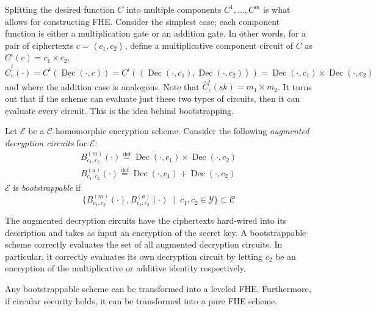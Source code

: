 Splitting the desired function $C$ into multiple components $C^1, \dots, C^m$ is what allows for constructing FHE. Consider the simplest case; each component function is either a multiplication gate or an addition gate. In other words, for a pair of ciphertexts $c = \left\langle c_1, c_2 \right\rangle$, define a multiplicative component circuit of $C$ as $C^i(c) = c_1 \times c_2$, $\hat{C}^i_c(\cdot) = C^i(\operatorname{Dec}(\cdot, c)) = C^i(\left\langle \operatorname{Dec}(\cdot, c_1), \operatorname{Dec}(\cdot, c_2) \right\rangle) = \operatorname{Dec}(\cdot, c_1) \times \operatorname{Dec}(\cdot, c_2)$ and where the addition case is analogous. Note that $\hat{C}^i_c(sk) = m_1 \times m_2$. It turns out that if the scheme can evaluate just these two types of circuits, then it can evaluate every circuit. This is the idea behind bootstrapping.
\begin{definition}
    \label{def:bootstrappable}
    Let $\mathcal{E}$ be a $\mathcal{C}$-homomorphic encryption scheme. Consider the following \emph{augmented decryption circuits} for $\mathcal{E}$:
    \begin{equation*}
    \begin{aligned}        
        B_{c_1,c_2}^{(m)}(\cdot) \stackrel{\mathrm{def}}{=} \operatorname{Dec}(\cdot, c_1) \times \operatorname{Dec}(\cdot, c_2)\\
        B_{c_1,c_2}^{(a)}(\cdot) \stackrel{\mathrm{def}}{=} \operatorname{Dec}(\cdot, c_1) + \operatorname{Dec}(\cdot, c_2)
    \end{aligned}
    \end{equation*}
    $\mathcal{E}$ is \emph{bootstrappable} if
    \begin{equation*}
    \{B_{c_1,c_2}^{(m)}(\cdot), B_{c_1,c_2}^{(a)}(\cdot) \; \mid \; c_1, c_2 \in \mathcal{Y}\} \subset \mathcal{C}
    \end{equation*}
\end{definition}
The augmented decryption circuits have the ciphertexts hard-wired into its description and takes as input an encryption of the secret key. A bootstrappable scheme correctly evaluates the set of all augmented decryption circuits. In particular, it correctly evaluates its own decryption circuit by letting $c_2$ be an encryption of the multiplicative or additive identity respectively.
\begin{theorem} \label{thm:bootstrapping}
Any bootstrappable scheme can be transformed into a leveled FHE. Furthermore, if circular security holds, it can be transformed into a pure FHE scheme.
\end{theorem}
